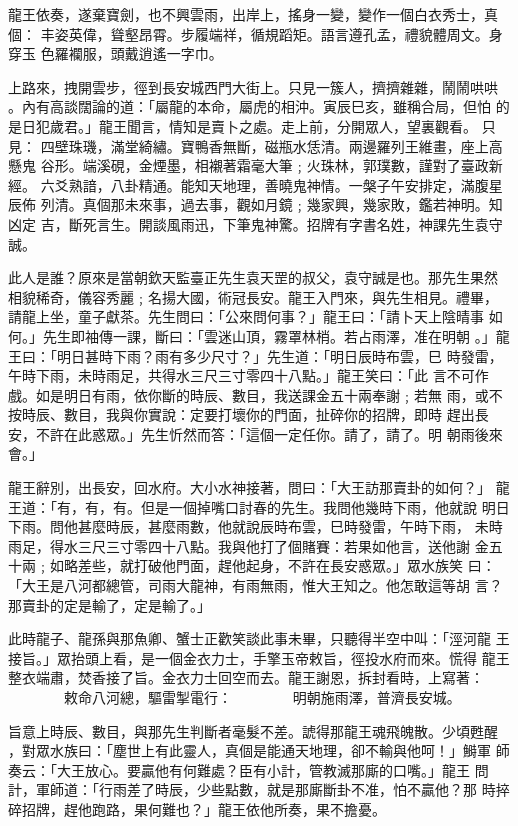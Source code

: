 \begin{pinyinscope}
{龍王依奏，遂棄寶劍，也不興雲雨，出岸上，搖身一變，變作一個白衣秀士，真
個：
丰姿英偉，聳壑昂霄。步履端祥，循規蹈矩。語言遵孔孟，禮貌體周文。身穿玉
色羅襴服，頭戴逍遙一字巾。

上路來，拽開雲步，徑到長安城西門大街上。只見一簇人，擠擠雜雜，鬧鬧哄哄
。內有高談闊論的道：「屬龍的本命，屬虎的相沖。寅辰巳亥，雖稱合局，但怕
的是日犯歲君。」龍王聞言，情知是賣卜之處。走上前，分開眾人，望裏觀看。
只見：
四壁珠璣，滿堂綺繡。寶鴨香無斷，磁瓶水恁清。兩邊羅列王維畫，座上高懸鬼
谷形。端溪硯，金煙墨，相襯著霜毫大筆﹔火珠林，郭璞數，謹對了臺政新經。
六爻熟諳，八卦精通。能知天地理，善曉鬼神情。一槃子午安排定，滿腹星辰佈
列清。真個那未來事，過去事，觀如月鏡﹔幾家興，幾家敗，鑑若神明。知凶定
吉，斷死言生。開談風雨迅，下筆鬼神驚。招牌有字書名姓，神課先生袁守誠。

此人是誰？原來是當朝欽天監臺正先生袁天罡的叔父，袁守誠是也。那先生果然
相貌稀奇，儀容秀麗﹔名揚大國，術冠長安。龍王入門來，與先生相見。禮畢，
請龍上坐，童子獻茶。先生問曰：「公來問何事？」龍王曰：「請卜天上陰晴事
如何。」先生即袖傳一課，斷曰：「雲迷山頂，霧罩林梢。若占雨澤，准在明朝
。」龍王曰：「明日甚時下雨？雨有多少尺寸？」先生道：「明日辰時布雲，巳
時發雷，午時下雨，未時雨足，共得水三尺三寸零四十八點。」龍王笑曰：「此
言不可作戲。如是明日有雨，依你斷的時辰、數目，我送課金五十兩奉謝﹔若無
雨，或不按時辰、數目，我與你實說：定要打壞你的門面，扯碎你的招牌，即時
趕出長安，不許在此惑眾。」先生忻然而答：「這個一定任你。請了，請了。明
朝雨後來會。」

龍王辭別，出長安，回水府。大小水神接著，問曰：「大王訪那賣卦的如何？」
龍王道：「有，有，有。但是一個掉嘴口討春的先生。我問他幾時下雨，他就說
明日下雨。問他甚麼時辰，甚麼雨數，他就說辰時布雲，巳時發雷，午時下雨，
未時雨足，得水三尺三寸零四十八點。我與他打了個賭賽：若果如他言，送他謝
金五十兩﹔如略差些，就打破他門面，趕他起身，不許在長安惑眾。」眾水族笑
曰：「大王是八河都總管，司雨大龍神，有雨無雨，惟大王知之。他怎敢這等胡
言？那賣卦的定是輸了，定是輸了。」

此時龍子、龍孫與那魚卿、蟹士正歡笑談此事未畢，只聽得半空中叫：「涇河龍
王接旨。」眾抬頭上看，是一個金衣力士，手擎玉帝敕旨，徑投水府而來。慌得
龍王整衣端肅，焚香接了旨。金衣力士回空而去。龍王謝恩，拆封看時，上寫著：
　　　　敕命八河總，驅雷掣電行：
　　　　明朝施雨澤，普濟長安城。

旨意上時辰、數目，與那先生判斷者毫髮不差。諕得那龍王魂飛魄散。少頃甦醒
，對眾水族曰：「塵世上有此靈人，真個是能通天地理，卻不輸與他呵！」鰣軍
師奏云：「大王放心。要贏他有何難處？臣有小計，管教滅那廝的口嘴。」龍王
問計，軍師道：「行雨差了時辰，少些點數，就是那廝斷卦不准，怕不贏他？那
時捽碎招牌，趕他跑路，果何難也？」龍王依他所奏，果不擔憂。

}
\end{pinyinscope}
